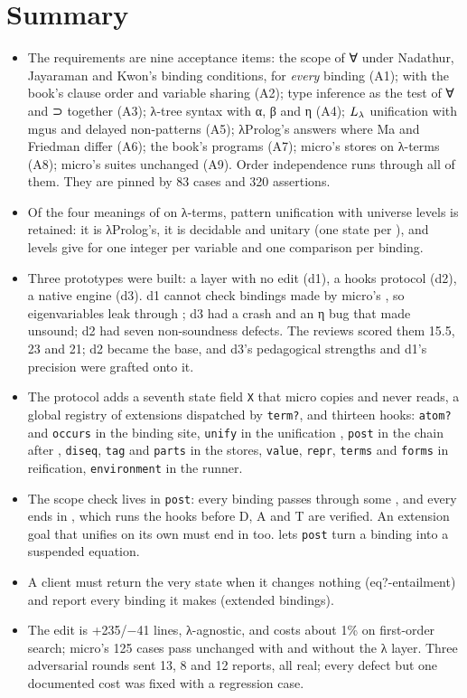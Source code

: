 \section{Summary}\label{sec:design-summary}

\begin{itemize}\emergencystretch=3em
\item The requirements are nine acceptance items: the scope of ∀ under Nadathur, Jayaraman and Kwon's
  binding conditions, for \emph{every} binding (A1);  with the book's clause order and variable
  sharing (A2); type inference as the test of ∀ and ⊃ together (A3); λ-tree syntax with α, β and η (A4);
  $L_\lambda$ unification with mgus and delayed non-patterns (A5); λProlog's answers where Ma and Friedman
  differ (A6); the book's programs (A7); micro's stores on λ-terms (A8); micro's suites unchanged
  (A9). Order independence runs through all of them. They are pinned by 83 cases and 320 assertions.
\item Of the four meanings of  on λ-terms, pattern unification with universe levels is
  retained: it is λProlog's, it is decidable and unitary (one state per ), and levels give
   for one integer per variable and one comparison per binding.
\item Three prototypes were built: a layer with no edit (d1), a hooks protocol (d2), a native engine
  (d3). d1 cannot check bindings made by micro's , so eigenvariables leak through ;
  d3 had a crash and an η bug that made  unsound; d2 had seven non-soundness defects. The
  reviews scored them 15.5, 23 and 21; d2 became the base, and d3's pedagogical strengths and d1's
  precision were grafted onto it.
\item The protocol adds a seventh state field \texttt{X} that micro copies and never reads, a global
  registry of extensions dispatched by \texttt{term?}, and thirteen hooks: \texttt{atom?} and
  \texttt{occurs} in the binding site, \texttt{unify} in the unification , \texttt{post} in the
  chain after , \texttt{diseq}, \texttt{tag} and \texttt{parts} in the stores, \texttt{value},
  \texttt{repr}, \texttt{terms} and \texttt{forms} in reification, \texttt{environment} in the runner.
\item The scope check lives in \texttt{post}: every binding passes through some , and every
   ends in , which runs the hooks before D, A and T are verified.
  An extension goal that unifies on its own must end in  too.
   lets \texttt{post} turn a binding into a suspended equation.
\item A client must return the very state when it changes nothing (eq?-entailment) and report every
  binding it makes (extended bindings).
\item The edit is +235/−41 lines, λ-agnostic, and costs about 1\% on first-order search; micro's 125
  cases pass unchanged with and without the λ layer. Three adversarial rounds sent 13, 8 and 12 reports,
  all real; every defect but one documented cost was fixed with a regression case.
\end{itemize}
